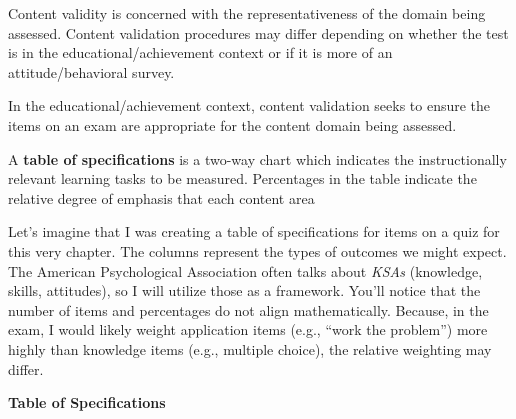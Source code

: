 \documentclass[
  english,
]{book}
\begin{document}
Content validity is concerned with the representativeness of the domain being assessed. Content validation procedures may differ depending on whether the test is in the educational/achievement context or if it is more of an attitude/behavioral survey.

In the educational/achievement context, content validation seeks to ensure the items on an exam are appropriate for the content domain being assessed.

A \textbf{table of specifications} is a two-way chart which indicates the instructionally relevant learning tasks to be measured. Percentages in the table indicate the relative degree of emphasis that each content area

Let's imagine that I was creating a table of specifications for items on a quiz for this very chapter. The columns represent the types of outcomes we might expect. The American Psychological Association often talks about \emph{KSAs} (knowledge, skills, attitudes), so I will utilize those as a framework. You'll notice that the number of items and percentages do not align mathematically. Because, in the exam, I would likely weight application items (e.g., ``work the problem'') more highly than knowledge items (e.g., multiple choice), the relative weighting may differ.

\textbf{Table of Specifications}
\end{document}
